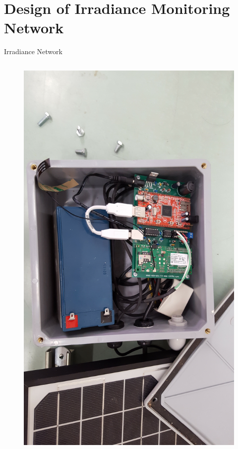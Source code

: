 \documentclass[aspectratio=169]{beamer}
\begin{document}
\section{Design of Irradiance Monitoring Network}
\begin{frame}{Irradiance Network}
\begin{columns}
\begin{column}{0.3\textwidth}
\begin{figure}[h]
\centering
\includegraphics[width=\textwidth]{../dissertation/figs/sensor_interior.jpg}

\end{figure}
\end{column}
\end{columns}
\end{frame}
\end{document}
